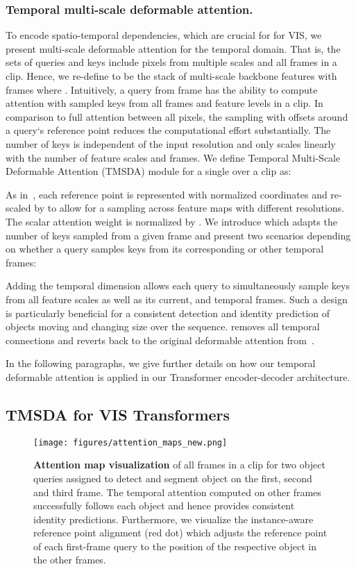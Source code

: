 \documentclass[runningheads]{llncs}
\begin{document}
\subsubsection{Temporal multi-scale deformable attention.}
To encode spatio-temporal dependencies, which are crucial for for VIS, we present multi-scale deformable attention for the temporal domain.
That is, the sets of queries and keys include pixels from multiple scales and all frames in a clip.
Hence, we re-define  to be the stack of  multi-scale backbone features with  frames where .
Intuitively, a query  from frame  has the ability to compute attention with sampled keys from all frames and feature levels in a clip.
In comparison to full attention between all pixels, the sampling with offsets around a query`s reference point  reduces the computational effort substantially.
The number of keys is independent of the input resolution and only scales linearly with the number of feature scales and frames.
We define Temporal Multi-Scale Deformable Attention (TMSDA) module for a single  over a clip as:





As in~\cite{deformable_detr}, each reference point is represented with normalized coordinates  and re-scaled by  to allow for a sampling across feature maps  with different resolutions.
The scalar attention weight  is normalized by . 
We introduce  which adapts the number of keys sampled from a given frame and present two scenarios depending on whether a query  samples keys from its corresponding or other temporal frames:

Adding the temporal dimension allows each query to simultaneously sample keys from all feature scales as well as its current, and temporal frames.
Such a design is particularly beneficial for a consistent detection and identity prediction of objects moving and changing size over the sequence.
 removes all temporal connections and reverts back to the original deformable attention from~\cite{deformable_detr}.

In the following paragraphs, we give further details on how our temporal deformable attention is applied in our Transformer encoder-decoder architecture.




\subsection{TMSDA for VIS Transformers}
\begin{figure}[t]
    \centering
    \texttt{[image: figures/attention\_maps\_new.png]}
    \caption{
    \textbf{Attention map visualization} of all frames in a clip for two object queries assigned to detect and segment object on the first, second and third frame.
The temporal attention computed on other frames successfully follows each object and hence provides consistent identity predictions.
Furthermore, we visualize the instance-aware reference point alignment (red dot) which adjusts the reference point of each first-frame query to the position of the respective object in the other frames.
    }


    \label{fig:attention_qual}
\end{figure}
%
 
\end{document}

